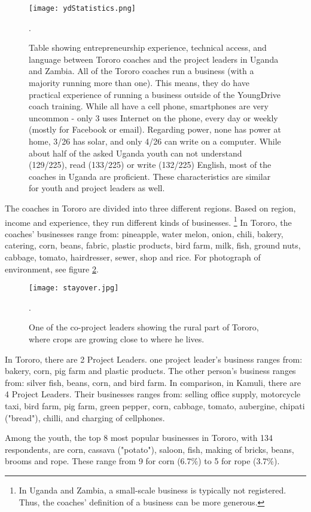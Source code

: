 \begin{figure}[h]
    \centering
    \texttt{[image: ydStatistics.png]}
    \caption{Table showing entrepreneurship experience, technical access, and language between Tororo coaches and the project leaders in Uganda and Zambia. All of the Tororo coaches run a business (with a majority running more than one). This means, they do have practical experience of running a business outside of the YoungDrive coach training. While all have a cell phone, smartphones are very uncommon - only 3 uses Internet on the phone, every day or weekly (mostly for Facebook or email). Regarding power, none has power at home, 3/26 has solar, and only 4/26 can write on a computer. While about half of the asked Uganda youth can not understand (129/225), read (133/225) or write (132/225) English, most of the coaches in Uganda are proficient. These characteristics are similar for youth and project leaders as well.}.
    \label{fig:ydStatistics}
\end{figure}

The coaches in Tororo are divided into three different regions. Based on region, income and experience, they run different kinds of businesses. \footnote{In Uganda and Zambia, a small-scale business is typically not registered. Thus, the coaches' definition of a business can be more generous.} In Tororo, the coaches' businesses range from: pineapple, water melon, onion, chili, bakery, catering, corn, beans, fabric, plastic products, bird farm, milk, fish, ground nuts, cabbage, tomato, hairdresser, sewer, shop and rice. For photograph of environment, see figure \ref{fig:tororo}.

\begin{figure}[h]
    \centering
    \texttt{[image: stayover.jpg]}
    \caption{One of the co-project leaders showing the rural part of Tororo, where crops are growing close to where he lives.}.
    \label{fig:tororo}
\end{figure}

In Tororo, there are 2 Project Leaders. one project leader's business ranges from: bakery, corn, pig farm and plastic products. The other person's business ranges from: silver fish, beans, corn, and bird farm. In comparison, in Kamuli, there are 4 Project Leaders. Their businesses ranges from: selling office supply, motorcycle taxi, bird farm, pig farm, green pepper, corn, cabbage, tomato, aubergine, chipati ("bread"), chilli, and charging of cellphones.

Among the youth, the top 8 most popular businesses in Tororo, with 134 respondents, are corn, cassava ("potato"), saloon, fish, making of bricks, beans, brooms and rope. These range from 9 for corn (6.7\%) to 5 for rope (3.7\%).

